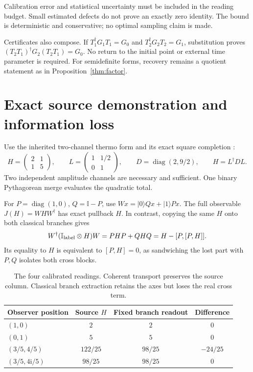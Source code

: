 \documentclass[11pt,a4paper]{article}
\newcommand{\adj}{\dagger}
\newcommand{\ii}{\mathrm{i}}
\newcommand{\Id}{\mathbb I}
\newcommand{\diag}{\operatorname{diag}}
\begin{document}
Calibration error and statistical uncertainty must be included in the
reading budget. Small estimated defects do not prove an exactly zero
identity. The bound is deterministic and conservative; no optimal sampling
claim is made.

Certificates also compose. If $T_1^\adj G_1T_1=G_0$ and
$T_2^\adj G_2T_2=G_1$, substitution proves
$(T_2T_1)^\adj G_2(T_2T_1)=G_0$. No return to the initial point or external
time parameter is required. For semidefinite forms, recovery remains a
quotient statement as in Proposition~\ref{thm:factor}.

\section{Exact source demonstration and information loss}

Use the inherited two-channel thermo form and its exact square completion
\cite{chd}:
\begin{equation}
H=\begin{pmatrix}2&1\\1&5\end{pmatrix},\qquad
L=\begin{pmatrix}1&1/2\\0&1\end{pmatrix},\qquad
D=\diag(2,9/2),\qquad H=L^\adj DL.
\end{equation}
Two independent amplitude channels are necessary and sufficient. One
binary Pythagorean merge evaluates the quadratic total.

For $P=\diag(1,0)$, $Q=\Id-P$, use $Wx=|0\rangle Qx+|1\rangle Px$.
The full observable $J(H)=WHW^\adj$ has exact pullback $H$. In contrast,
copying the same $H$ onto both classical branches gives
\begin{equation}\label{eq:branch}
W^\adj(\Id_{\rm label}\otimes H)W=PHP+QHQ
=H-[P,[P,H]].
\end{equation}
Its equality to $H$ is equivalent to $[P,H]=0$, as sandwiching the lost
part with $P,Q$ isolates both cross blocks.

\begin{table}[ht]
\centering
\caption{The four calibrated readings. Coherent transport preserves the
source column. Classical branch extraction retains the axes but loses the
real cross term.}
\begin{tabular}{lccc}
\toprule
Observer position & Source $H$ & Fixed branch readout & Difference\\
\midrule
$(1,0)$ & $2$ & $2$ & $0$\\
$(0,1)$ & $5$ & $5$ & $0$\\
$(3/5,4/5)$ & $122/25$ & $98/25$ & $-24/25$\\
$(3/5,4\ii/5)$ & $98/25$ & $98/25$ & $0$\\
\bottomrule
\end{tabular}
\end{table}
\end{document}
